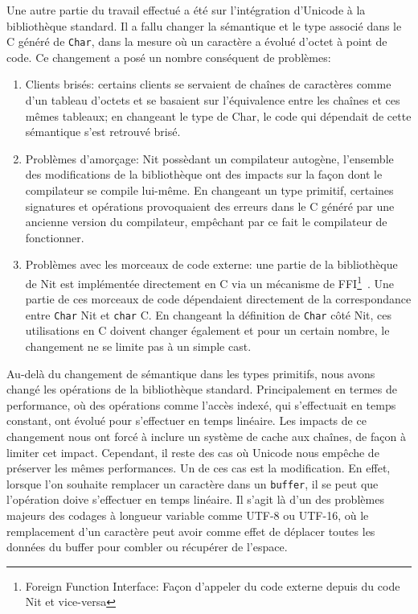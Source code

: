 Une autre partie du travail effectué a été sur l'intégration d'Unicode à la bibliothèque standard.
Il a fallu changer la sémantique et le type associé dans le C généré de \texttt{Char}, dans la mesure
où un caractère a évolué d'octet à point de code.
Ce changement a posé un nombre conséquent de problèmes:

\begin{enumerate}
	\item Clients brisés: certains clients se servaient de chaînes de caractères comme d'un tableau d'octets et se basaient sur l'équivalence entre les chaînes et ces mêmes tableaux; en changeant le type de Char, le code qui dépendait de cette sémantique s'est retrouvé brisé.
	\item Problèmes d'amorçage: Nit possèdant un compilateur autogène, l'ensemble des modifications de la bibliothèque ont des impacts sur la façon dont le compilateur se compile lui-même. En changeant un type primitif, certaines signatures et opérations provoquaient des erreurs dans le C généré par une ancienne version du compilateur, empêchant par ce fait le compilateur de fonctionner.
	\item Problèmes avec les morceaux de code externe: une partie de la bibliothèque de Nit est implémentée directement en C via un mécanisme de FFI\footnote{Foreign Function Interface: Façon d'appeler du code externe depuis du code Nit et vice-versa}~\cite{xymus_memoire}.
		Une partie de ces morceaux de code dépendaient directement de la correspondance entre \texttt{Char} Nit et
		\texttt{char} C.
		En changeant la définition de \texttt{Char} côté Nit, ces utilisations en C doivent changer également et pour
		un certain nombre, le changement ne se limite pas à un simple cast.
\end{enumerate}

Au-delà du changement de sémantique dans les types primitifs,
nous avons changé les opérations de la bibliothèque standard.
Principalement en termes de performance, où des opérations comme
l'accès indexé, qui s'effectuait en temps constant, ont évolué pour s'effectuer en temps linéaire.
Les impacts de ce changement nous ont forcé à inclure un système de cache aux chaînes, de façon à limiter cet impact.
Cependant, il reste des cas où Unicode nous empêche de préserver les mêmes performances.
Un de ces cas est la modification.
En effet, lorsque l'on souhaite remplacer un caractère dans un \texttt{buffer}, il se peut que l'opération doive
s'effectuer en temps linéaire.
Il s'agit là d'un des problèmes majeurs des codages à longueur variable comme UTF-8 ou UTF-16, où le remplacement
d'un caractère peut avoir comme effet de déplacer toutes les données du buffer pour combler ou récupérer
de l'espace.

